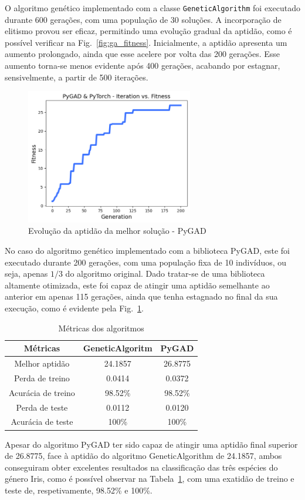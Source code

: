 O algoritmo genético implementado com a classe \texttt{GeneticAlgorithm} foi executado durante 600 gerações, com uma população de 30 soluções. A incorporação de elitismo provou ser eficaz, permitindo uma evolução gradual da aptidão, como é possível verificar na Fig.~\ref{fig:ga_fitness}. Inicialmente, a aptidão apresenta um aumento prolongado, ainda que esse acelere por volta das 200 gerações. Esse aumento torna-se menos evidente após 400 gerações, acabando por estagnar, sensivelmente, a partir de 500 iterações.

\begin{figure}[htbp]
    \centering
    \includegraphics[width=0.65\textwidth]{images/pygad_fitness}
    \caption{Evolução da aptidão da melhor solução - PyGAD}
    \label{fig:pygad_fitness}
\end{figure}

No caso do algoritmo genético implementado com a biblioteca PyGAD, este foi executado durante 200 gerações, com uma população fixa de 10 indivíduos, ou seja, apenas $1/3$ do algoritmo original. Dado tratar-se de uma biblioteca altamente otimizada, este foi capaz de atingir uma aptidão semelhante ao anterior em apenas 115 gerações, ainda que tenha estagnado no final da sua execução, como é evidente pela Fig.~\ref{fig:pygad_fitness}.

\begin{table}[htbp]
    \centering
    \begin{tabular}{ccc} 
        \hline
        \textbf{Métricas} & \textbf{GeneticAlgoritm}  & \textbf{PyGAD} \\ \hline
        Melhor aptidão & 24.1857 & 26.8775 \\
        Perda de treino & 0.0414 & 0.0372 \\
        Acurácia de treino & 98.52\% & 98.52\% \\
        Perda de teste & 0.0112 & 0.0120 \\
        Acurácia de teste & 100\% & 100\% \\ \hline
    \end{tabular}
    \caption{Métricas dos algoritmos}
    \label{tab:metrics}
\end{table}

Apesar do algoritmo PyGAD ter sido capaz de atingir uma aptidão final superior de 26.8775, face à aptidão do algoritmo GeneticAlgorithm de 24.1857, ambos conseguiram obter excelentes resultados na classificação das três espécies do género Iris, como é possível observar na Tabela~\ref{tab:metrics}, com uma exatidão de treino e teste de, respetivamente, 98.52\% e 100\%.